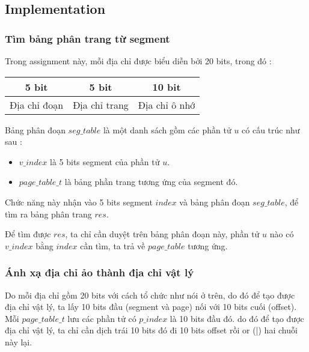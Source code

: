 \newpage

\subsection{Implementation}
\subsubsection{Tìm bảng phân trang từ segment}

Trong assignment này, mỗi địa chỉ được biểu diễn bởi 20 bits, trong đó : 

\begin{table}[!htp]
	\centering
	\def\arraystretch{2}
	\begin{tabular}{lll}
	\hline
	\multicolumn{1}{|c|}{5 bit} & \multicolumn{1}{c|}{5 bit} & \multicolumn{1}{c|}{10 bit} \\ \hline
	Địa chỉ đoạn                & Địa chỉ trang              & Địa chỉ ô nhớ              
	\end{tabular}
\end{table}

Bảng phân đoạn $ seg\_table $ là một danh sách gồm các phần tử $ u $ có cấu trúc như sau :
\begin{itemize}
	\item $ v\_index $ là 5 bits segment của phần tử $ u $.
	\item $  page\_table\_t $ là bảng phần trang tương ứng của segment đó.
\end{itemize}

Chức năng này nhận vào 5 bits segment $ index $ và bảng phân đoạn $ seg\_table $, để tìm ra bảng phân trang $ res $.

Để tìm được $ res $, ta chỉ cần duyệt trên bảng phân đoạn này, phần tử $ u $ nào có $ v\_index $ bằng $ index $ cần tìm, ta trả về $ page\_table $ tương ứng.



\newpage

\subsubsection{Ánh xạ địa chỉ ảo thành địa chỉ vật lý}

Do mỗi địa chỉ gồm 20 bits với cách tổ chức như nói ở trên, do đó để tạo được địa chỉ vật lý, ta lấy 10 bits đầu (segment và page) nối với 10 bits cuối (offset). Mỗi $ page\_table\_t $ lưu các phần tử có $ p\_index $ là 10 bits đầu đó. do đó để tạo được địa chỉ vật lý, ta chỉ cần dịch trái 10 bits đó đi 10  bits offset rồi or (|) hai chuỗi này lại.

